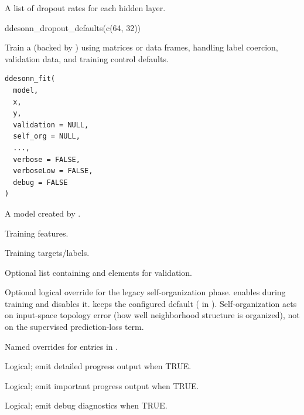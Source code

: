 \documentclass[a4paper]{book}
\begin{document}
%
\begin{Value}
A list of dropout rates for each hidden layer.
\end{Value}
%
\begin{Examples}
\begin{ExampleCode}
ddesonn_dropout_defaults(c(64, 32))

\end{ExampleCode}
\end{Examples}
%
\begin{Description}
Train a  (backed by ) using matrices or
data frames, handling label coercion, validation data, and training control
defaults.
\end{Description}
%
\begin{Usage}
\begin{verbatim}
ddesonn_fit(
  model,
  x,
  y,
  validation = NULL,
  self_org = NULL,
  ...,
  verbose = FALSE,
  verboseLow = FALSE,
  debug = FALSE
)
\end{verbatim}
\end{Usage}
%
\begin{Arguments}
\begin{ldescription}
\item[\code{model}] A model created by .

\item[\code{x}] Training features.

\item[\code{y}] Training targets/labels.

\item[\code{validation}] Optional list containing  and  elements for validation.

\item[\code{self\_org}] Optional logical override for the legacy self-organization
phase.  enables  during training and 
disables it.  keeps the configured default ( in
). Self-organization acts on input-space
topology error (how well neighborhood structure is organized), not on the
supervised prediction-loss term.

\item[\code{...}] Named overrides for entries in .

\item[\code{verbose}] Logical; emit detailed progress output when TRUE.

\item[\code{verboseLow}] Logical; emit important progress output when TRUE.

\item[\code{debug}] Logical; emit debug diagnostics when TRUE.
\end{ldescription}
\end{Arguments}
\end{document}
